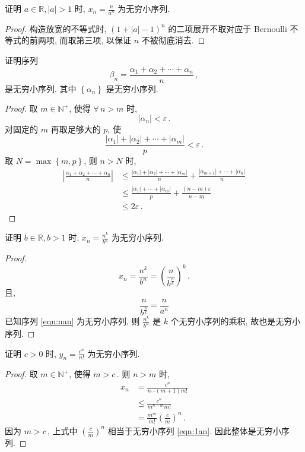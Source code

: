 \documentclass{book}
\newcommand{\Any}{\forall\,}
\newcommand{\set}[1]{\left\{#1\right\}}
\newcommand{\abs}[1]{\left\lvert #1 \right\rvert}
\newcommand{\R}{\mathbb{R}}
\newcommand{\N}{\mathbb{N}}
\renewcommand{\le}{\leqslant}
\numberwithin{equation}{section}
\numberwithin{figure}{section}
\theoremstyle{definition}
\begin{document}
证明 $a\in\R,\abs{a}>1$ 时, $x_n=\frac{n}{a^n}$ 为无穷小序列.
\begin{proof}
  构造放宽的不等式时, $\left( 1+\abs{a}-1 \right)^n$ 的二项展开不取对应于 Bernoulli 不等式的前两项, 而取第三项, 以保证 $n$ 不被彻底消去.
\end{proof}

证明序列
\begin{equation*}
  \beta_n=\frac{\alpha_1+\alpha_2+\cdots+\alpha_n}{n}\,,
\end{equation*}
是无穷小序列. 其中 $\set{\alpha_n}$ 是无穷小序列.
\begin{proof}
  取 $m\in\N^+$, 使得 $\Any n>m$ 时, 
  \begin{equation*}\abs{\alpha_n}<\varepsilon\,.\end{equation*}
  对固定的 $m$ 再取足够大的 $p$, 使
  \begin{equation*}
    \frac{\abs{\alpha_1}+\abs{\alpha_2}+\cdots+\abs{\alpha_m}}{p}<\varepsilon\,.
  \end{equation*}
  取 $N=\max\set{m,p}$, 则 $n>N$ 时, 
  \begin{align*}
    \abs{\frac{\alpha_1+\alpha_2+\cdots+\alpha_n}{n}}&\le\frac{\abs{\alpha_1}+\abs{\alpha_2}+\cdots+\abs{\alpha_m}}{n}+\frac{\abs{\alpha_{m+1}}+\cdots+\abs{\alpha_n}}{n}\\
    &\le\frac{\abs{\alpha_1}+\cdots+\abs{\alpha_m}}{p}+\frac{(n-m)\varepsilon}{n-m}\\
    &\le2\varepsilon\,.
  \end{align*}
\end{proof}

证明 $b\in\R,b>1$ 时, $x_n=\frac{n^k}{b^n}$ 为无穷小序列.
\begin{proof}
  \begin{equation*}
    x_n=\frac{n^k}{b^n}=\left( \frac{n}{b^{\frac{n}{k}}} \right)^k\,.
  \end{equation*}
  且,
  \begin{equation*}
    \frac{n}{b^{\frac{n}{k}}}=\frac{n}{a^n}
  \end{equation*}
  已知序列 \ref{eqn:nan} 为无穷小序列, 则 $\frac{n^k}{b^n}$ 是 $k$ 个无穷小序列的乘积, 故也是无穷小序列.
\end{proof}

证明 $c>0$ 时, $y_n=\frac{c^n}{n!}$ 为无穷小序列.
\begin{proof}
  取 $m\in\N^+$, 使得 $m>c$\,. 则 $n>m$ 时, 
  \begin{align*}
    x_n&=\frac{c^n}{n\cdots(m+1)m!}\\
    &\le\frac{c^n}{m^{n-m}m!}\\
    &=\frac{m^m}{m!}\left( \frac{c}{m} \right)^n\,.
  \end{align*}
  因为 $m>c$\,, 上式中 $\left( \frac{c}{m} \right)^n$ 相当于无穷小序列 \ref{eqn:1an}. 因此整体是无穷小序列.
\end{proof}
\end{document}

